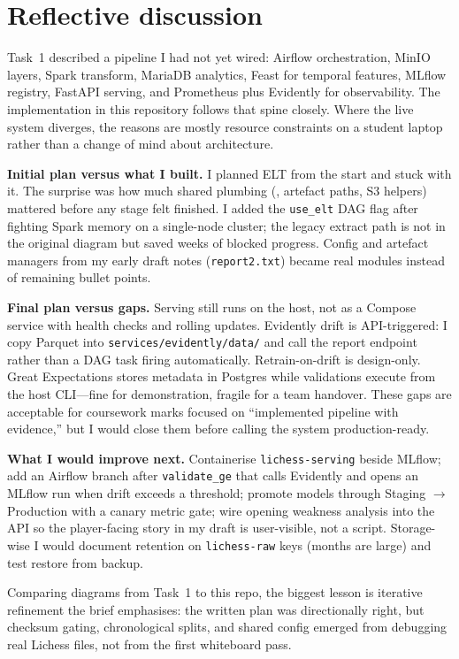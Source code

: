 \section{Reflective discussion}
\label{sec:reflection}

Task~1 described a pipeline I had not yet wired: Airflow orchestration, MinIO layers, Spark transform, MariaDB analytics, Feast for temporal features, MLflow registry, FastAPI serving, and Prometheus plus Evidently for observability. The implementation in this repository follows that spine closely. Where the live system diverges, the reasons are mostly resource constraints on a student laptop rather than a change of mind about architecture.

\textbf{Initial plan versus what I built.} I planned ELT from the start and stuck with it. The surprise was how much shared plumbing (, artefact paths, S3 helpers) mattered before any stage felt finished. I added the \texttt{use\_elt} DAG flag after fighting Spark memory on a single-node cluster; the legacy extract path is not in the original diagram but saved weeks of blocked progress. Config and artefact managers from my early draft notes (\texttt{report2.txt}) became real modules instead of remaining bullet points.

\textbf{Final plan versus gaps.} Serving still runs on the host, not as a Compose service with health checks and rolling updates. Evidently drift is API-triggered: I copy Parquet into \texttt{services/evidently/data/} and call the report endpoint rather than a DAG task firing automatically. Retrain-on-drift is design-only. Great Expectations stores metadata in Postgres while validations execute from the host CLI---fine for demonstration, fragile for a team handover. These gaps are acceptable for coursework marks focused on ``implemented pipeline with evidence,'' but I would close them before calling the system production-ready.

\textbf{What I would improve next.} Containerise \texttt{lichess-serving} beside MLflow; add an Airflow branch after \texttt{validate\_ge} that calls Evidently and opens an MLflow run when drift exceeds a threshold; promote models through Staging $\rightarrow$ Production with a canary metric gate; wire opening weakness analysis into the API so the player-facing story in my draft is user-visible, not a script. Storage-wise I would document retention on \texttt{lichess-raw} keys (months are large) and test restore from backup.

Comparing diagrams from Task~1 to this repo, the biggest lesson is iterative refinement the brief emphasises: the written plan was directionally right, but checksum gating, chronological splits, and shared config emerged from debugging real Lichess files, not from the first whiteboard pass.


